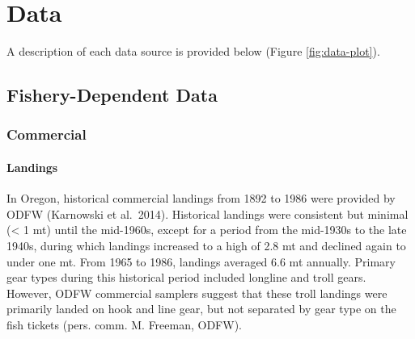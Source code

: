 \documentclass[11pt,
  english,
  a4paper,
]{article}
\begin{document}
\leavevmode\tagmcend\tagstructend\par


\hypertarget{data}{%
\section{Data}\label{data}}

\leavevmode\tagmcend\tagstructend


A description of each data source is provided below (Figure \ref{fig:data-plot}).

\leavevmode\tagmcend\tagstructend\par


\hypertarget{fishery-dependent-data}{%
\subsection{Fishery-Dependent Data}\label{fishery-dependent-data}}

\leavevmode\tagmcend\tagstructend


\hypertarget{commercial}{%
\subsubsection{Commercial}\label{commercial}}

\leavevmode\tagmcend\tagstructend


\hypertarget{landings-1}{%
\paragraph{Landings}\label{landings-1}}

\leavevmode\tagmcend\tagstructend


In Oregon, historical commercial landings from 1892 to 1986 were provided by ODFW (Karnowski et al.~2014). Historical landings were consistent but minimal (\textless{} 1 mt) until the mid-1960s, except for a period from the mid-1930s to the late 1940s, during which landings increased to a high of 2.8 mt and declined again to under one mt. From 1965 to 1986, landings averaged 6.6 mt annually. Primary gear types during this historical period included longline and troll gears. However, ODFW commercial samplers suggest that these troll landings were primarily landed on hook and line gear, but not separated by gear type on the fish tickets (pers. comm. M. Freeman, ODFW).
\end{document}
